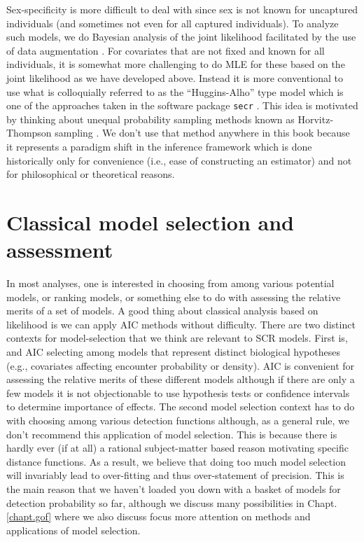 Sex-specificity is more difficult to deal with since sex is not known
for uncaptured individuals (and sometimes not even for all captured
individuals).  To analyze such models, we do Bayesian analysis of the
joint likelihood facilitated by the use of data augmentation
\citep{gardner_etal:2010jwm,russell_etal:2012}. For covariates that are
not fixed and known for all individuals, it is somewhat more
challenging to do MLE for these based on the joint likelihood as we
have developed above. Instead it is more conventional to use what is
colloquially referred to as the ``Huggins-Alho'' type model which is
one of the approaches taken in the software package \mbox{\tt secr}
\citep[][see Sec. \ref{mle.sec.secr}]{efford:2011}. This idea is
motivated by thinking about unequal probability sampling methods known
as Horvitz-Thompson sampling \citep[e.g.,
see][]{overton_stehman:1995}.  We don't use that method anywhere in
this book because it represents a paradigm shift in the inference
framework which is done historically only for convenience (i.e., ease
of constructing an estimator) and not for philosophical or theoretical
reasons.


\section{Classical model selection and assessment}

In most analyses, one is interested in choosing from among various
potential models, or ranking models, or something else to do with
assessing the relative merits of a set of models. A good thing about
classical analysis based on likelihood is we can apply AIC methods
\citep{burnham_anderson:2002} without difficulty. There are two
distinct contexts for model-selection that we think are relevant to
SCR models. First is, and AIC selecting among models that represent
distinct biological hypotheses (e.g., covariates affecting encounter
probability or density). AIC is convenient for assessing the relative
merits of these different models although if there are only a few
models it is not objectionable to use hypothesis tests or confidence
intervals to determine importance of effects. The second model
selection context has to do with choosing among various detection
functions although, as a general rule, we don't recommend this
application of model selection.  This is because there is hardly ever
(if at all) a rational subject-matter based reason motivating specific
distance functions. As a result, we believe that doing too much model
selection will invariably lead to over-fitting and thus over-statement
of precision. This is the main reason that we haven't loaded you down
with a basket of models for detection probability so far, although we
discuss many possibilities in Chapt. \ref{chapt.gof} where we also
discuss focus more attention on methods and applications of model selection.


